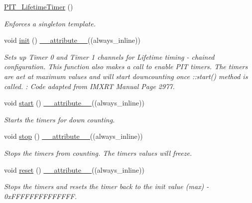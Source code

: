 \begin{DoxyCompactItemize}
\item 
\hyperlink{classPIT__LifetimeTimer_a826797e75688ab4e7cd5c8854fa6a7c0}{P\+I\+T\+\_\+\+Lifetime\+Timer} ()
\begin{DoxyCompactList}\small\item\em Enforces a singleton template. \end{DoxyCompactList}\item 
void \hyperlink{classPIT__LifetimeTimer_ad1c585d138123be94769afcca87f2dc6}{init} () \hyperlink{utilities_8hpp_a103d5b3998e0dd804213c8f30a094f4d}{\+\_\+\+\_\+attribute\+\_\+\+\_\+}((always\+\_\+inline))
\begin{DoxyCompactList}\small\item\em Sets up Timer 0 and Timer 1 channels for Lifetime timing -\/ chained configuration. This function also makes a call to enable P\+IT timers. The timers are aet at maximum values and will start downcounting once \+::start() method is called.  \+: Code adapted from I\+M\+X\+RT Manual Page 2977. \end{DoxyCompactList}\item 
void \hyperlink{classPIT__LifetimeTimer_a6feabeff2529cabaf27ef53d027a4fc9}{start} () \hyperlink{utilities_8hpp_a103d5b3998e0dd804213c8f30a094f4d}{\+\_\+\+\_\+attribute\+\_\+\+\_\+}((always\+\_\+inline))
\begin{DoxyCompactList}\small\item\em Starts the timers for down counting. \end{DoxyCompactList}\item 
void \hyperlink{classPIT__LifetimeTimer_a92543f292044725b1dea4d009e01d9e4}{stop} () \hyperlink{utilities_8hpp_a103d5b3998e0dd804213c8f30a094f4d}{\+\_\+\+\_\+attribute\+\_\+\+\_\+}((always\+\_\+inline))
\begin{DoxyCompactList}\small\item\em Stops the timers from counting. The timers values will freeze. \end{DoxyCompactList}\item 
void \hyperlink{classPIT__LifetimeTimer_a5c1c38cfa6c7a049a495ee3d89e13276}{reset} () \hyperlink{utilities_8hpp_a103d5b3998e0dd804213c8f30a094f4d}{\+\_\+\+\_\+attribute\+\_\+\+\_\+}((always\+\_\+inline))
\begin{DoxyCompactList}\small\item\em Stops the timers and resets the timer back to the init value (max) -\/ 0x\+F\+F\+F\+F\+F\+F\+F\+F\+F\+F\+F\+F\+FF. \end{DoxyCompactList}\item 

\end{DoxyCompactItemize}
